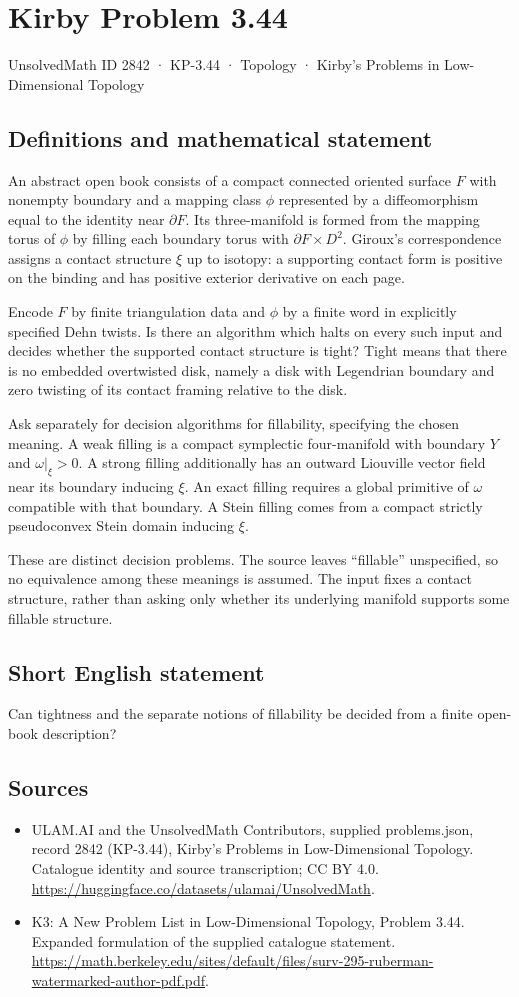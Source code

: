 \documentclass[11pt,a4paper]{article}
\begin{document}
\section*{Kirby Problem 3.44}\label{2842}
{\small UnsolvedMath ID 2842 · KP-3.44 · Topology · Kirby's Problems in Low-Dimensional Topology}
\subsection{Definitions and mathematical statement}
An abstract open book consists of a compact connected oriented surface $F$ with nonempty boundary and a mapping class $\phi$ represented by a diffeomorphism equal to the identity near $\partial F$. Its three-manifold is formed from the mapping torus of $\phi$ by filling each boundary torus with $\partial F\times D^2$. Giroux's correspondence assigns a contact structure $\xi$ up to isotopy: a supporting contact form is positive on the binding and has positive exterior derivative on each page.

Encode $F$ by finite triangulation data and $\phi$ by a finite word in explicitly specified Dehn twists. Is there an algorithm which halts on every such input and decides whether the supported contact structure is tight? Tight means that there is no embedded overtwisted disk, namely a disk with Legendrian boundary and zero twisting of its contact framing relative to the disk.

Ask separately for decision algorithms for fillability, specifying the chosen meaning. A weak filling is a compact symplectic four-manifold with boundary $Y$ and $\omega|_\xi>0$. A strong filling additionally has an outward Liouville vector field near its boundary inducing $\xi$. An exact filling requires a global primitive of $\omega$ compatible with that boundary. A Stein filling comes from a compact strictly pseudoconvex Stein domain inducing $\xi$.

These are distinct decision problems. The source leaves ``fillable'' unspecified, so no equivalence among these meanings is assumed. The input fixes a contact structure, rather than asking only whether its underlying manifold supports some fillable structure.
\subsection{Short English statement}
Can tightness and the separate notions of fillability be decided from a finite open-book description?
\subsection{Sources}
\begin{itemize}
\item[S1] ULAM.AI and the UnsolvedMath Contributors, supplied problems.json, record 2842 (KP-3.44), Kirby's Problems in Low-Dimensional Topology. Catalogue identity and source transcription; CC BY 4.0.
\url{https://huggingface.co/datasets/ulamai/UnsolvedMath}.
\item[S2] K3: A New Problem List in Low-Dimensional Topology, Problem 3.44. Expanded formulation of the supplied catalogue statement.
\url{https://math.berkeley.edu/sites/default/files/surv-295-ruberman-watermarked-author-pdf.pdf}.
\end{itemize}
\end{document}
